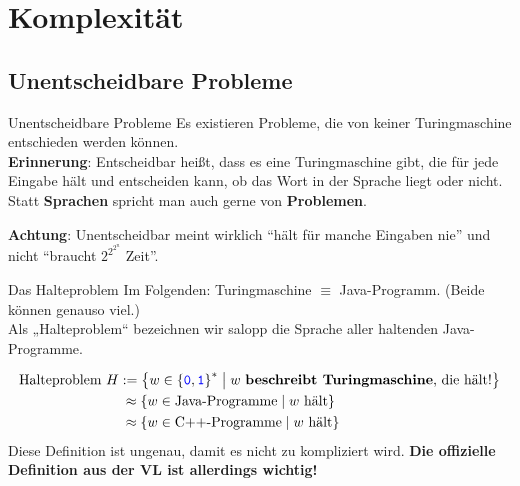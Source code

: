 \section{Komplexität}

\subsection{Unentscheidbare Probleme}
\begin{frame}{Unentscheidbare Probleme}
	Es existieren Probleme, die von keiner Turingmaschine entschieden werden können.\\ \pause
	\textbf{Erinnerung}: Entscheidbar heißt, dass es eine Turingmaschine gibt, die für jede Eingabe hält und entscheiden kann, ob das Wort in der Sprache liegt oder nicht. Statt \textbf{Sprachen} spricht man auch gerne von \textbf{Problemen}.\\ \pause
	
	\bigskip
	\textbf{Achtung}: Unentscheidbar meint wirklich \enquote{hält für manche Eingaben nie} und nicht \enquote{braucht $2^{2^{2^{n}}}$ Zeit}.
\end{frame}

\begin{frame}{Das Halteproblem}
	Im Folgenden: Turingmaschine $\equiv$ Java-Programm. {\small (Beide können genauso viel.)}\\ \pause
	\bigskip
	Als „Halteproblem“ bezeichnen wir salopp die Sprache aller haltenden Java-Programme.
	\begin{Definition} 
		\begin{align*}
		\text{Halteproblem } H &:= \left\{w \in \left\{\hbox{\textcolor{blue}{\texttt{0}}}, \hbox{\textcolor{blue}{\texttt{1}}}\right\}^* \;\middle|\; w \text{ \textbf{beschreibt Turingmaschine}, die hält!}\right\} \\
		&\:\approx \left\{w \in \text{Java-Programme} \;\middle|\; w \text{ hält}\right\} \\
		&\:\approx \left\{w \in \text{C++-Programme} \;\middle|\; w \text{ hält}\right\}
		\end{align*}
		Diese Definition ist ungenau, damit es nicht zu kompliziert wird. \textbf{Die offizielle Definition aus der VL ist allerdings wichtig!}
	\end{Definition}
\end{frame}

